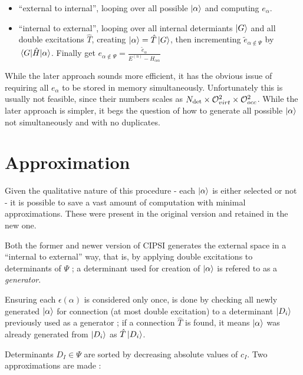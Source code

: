 \documentclass[./thesis.tex]{subfiles}
\begin{document}
\begin{itemize}
\item
``external to internal'', looping over all possible ${\ket{\alpha}}$ and computing $e_\alpha$.
\item
``internal to external'', looping over all internal determiants $\ket G$ and all double excitations $\hat T$, creating ${\ket{\alpha}} = \hat T \ket G$, then incrementing $\tilde e_{\alpha \notin \Psi}$ by $\mel{G}{\hat{H}}{\alpha}$. Finally get $e_{\alpha \notin \Psi} = \frac{\tilde e_\alpha}{E^{(n)} - H_{\alpha \alpha}}$
\end{itemize}

While the later approach sounds more efficient, it has the obvious issue of requiring all $e_\alpha$ to be stored in memory simultaneously. Unfortunately this is usually not feasible, since their numbers scales as ${N_\text{det}} \times \mathcal{O}_{virt}^2 \times \mathcal{O}_{occ}^2$.
While the later approach is simpler, it begs the question of how to generate all possible ${\ket{\alpha}}$ not simultaneously and with no duplicates. 


\section{Approximation}

Given the qualitative nature of this procedure - each ${\ket{\alpha}}$ is either selected or not - it is possible to save a vast amount of computation with minimal approximations. These were present in the original version and retained in the new one.

Both the former and newer version of CIPSI generates the external space in a ``internal to external'' way, that is, by applying double excitations to determinants of $\Psi$ ; a determinant used for creation of ${\ket{\alpha}}$ is refered to as a \emph{generator}.

Ensuring each $\epsilon(\alpha)$ is considered only once, is done by checking all newly generated ${\ket{\alpha}}$ for connection (at most double excitation) to a determinant $\ket {D_i}$ previously used as a generator ; if a connection $\hat T$ is found, it means ${\ket{\alpha}}$ was already generated from $\ket {D_i}$ as $\hat T \ket {D_i}$.

Determinants $D_I \in \Psi$ are sorted by decreasing absolute values of $c_I$. Two approximations are made :
\end{document}
